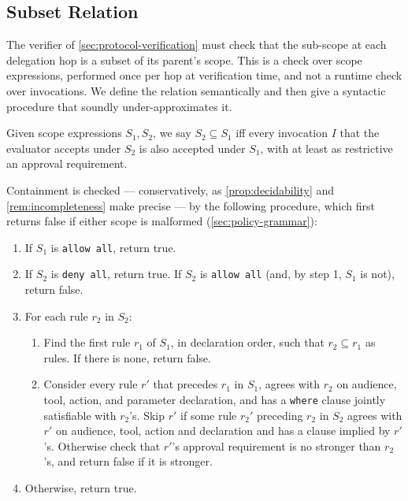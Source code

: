 \documentclass[11pt,a4paper]{article}
\begin{document}
\subsection{Subset Relation}
\label{sec:policy-subset}

The verifier of \cref{sec:protocol-verification} must check that the
sub-scope at each delegation hop is a subset of its parent's scope.
This is a check over scope expressions, performed once per hop at
verification time, and not a runtime check over invocations. We define
the relation semantically and then give a syntactic procedure that
soundly under-approximates it.

\begin{definition}
\label{def:subset}
Given scope expressions $S_1, S_2$, we say $S_2 \subseteq S_1$ iff every
invocation $I$ that the evaluator accepts under $S_2$ is also accepted
under $S_1$, with at least as restrictive an approval requirement.
\end{definition}

Containment is checked --- conservatively, as \cref{prop:decidability}
and \cref{rem:incompleteness} make precise --- by the following
procedure, which first returns false if either scope is malformed
(\cref{sec:policy-grammar}):

\begin{enumerate}
    \item If $S_1$ is \texttt{allow all}, return true.
    \item If $S_2$ is \texttt{deny all}, return true. If $S_2$ is
          \texttt{allow all} (and, by step 1, $S_1$ is not), return
          false.
    \item For each rule $r_2$ in $S_2$:
    \begin{enumerate}
        \item Find the first rule $r_1$ of $S_1$, in declaration
              order, such that $r_2 \subseteq r_1$ as rules. If there is
              none, return false.
        \item Consider every rule $r'$ that precedes $r_1$ in $S_1$,
              agrees with $r_2$ on audience, tool, action, and parameter
              declaration, and has a \texttt{where} clause jointly
              satisfiable with $r_2$'s. Skip $r'$ if some rule $r_2'$
              preceding $r_2$ in $S_2$ agrees with $r'$ on audience,
              tool, action and declaration and has a clause implied by
              $r'$'s. Otherwise check that $r'$'s approval requirement
              is no stronger than $r_2$'s, and return false if it is
              stronger.
    \end{enumerate}
    \item Otherwise, return true.
\end{enumerate}
\end{document}
